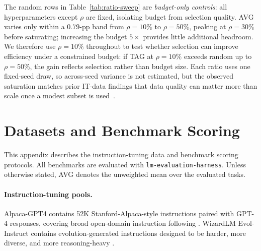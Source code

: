 The random rows in Table~\ref{tab:ratio-sweep} are \emph{budget-only controls}: all hyperparameters except \(\rho\) are fixed, isolating budget from selection quality. AVG varies only within a \(0.79\)-pp band from \(\rho=10\%\) to \(\rho=50\%\), peaking at \(\rho=30\%\) before saturating; increasing the budget \(5\times\) provides little additional headroom. We therefore use \(\rho=10\%\) throughout to test whether selection can improve efficiency under a constrained budget: if \textsc{TAG} at \(\rho=10\%\) exceeds random up to \(\rho=50\%\), the gain reflects selection rather than budget size. Each ratio uses one fixed-seed draw, so across-seed variance is not estimated, but the observed saturation matches prior IT-data findings that data quality can matter more than scale once a modest subset is used~\cite{zhou2023lima}.

\section{Datasets and Benchmark Scoring}
\label{app:benchmarks}

This appendix describes the instruction-tuning data and benchmark
scoring protocols. All benchmarks are evaluated with
\texttt{lm\allowbreak-evaluation\allowbreak-harness}. Unless otherwise
stated, AVG denotes the unweighted mean over the evaluated tasks.

\vspace{-0.8em}
\paragraph{Instruction-tuning pools.}
Alpaca-GPT4 contains 52K Stanford-Alpaca-style instructions paired with
GPT-4 responses, covering broad open-domain instruction following
\cite{wang2023selfinstruct}. WizardLM Evol-Instruct contains
evolution-generated instructions designed to be harder, more diverse,
and more reasoning-heavy \cite{xu2024wizardlm}.
\vspace{-0.8em}
